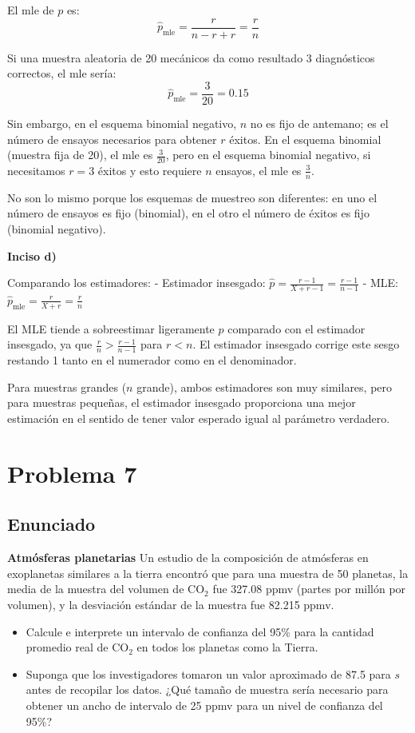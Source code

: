 \documentclass[12pt]{article}
\begin{document}
El mle de $p$ es:
$$\hat{p}_{\text{mle}} = \frac{r}{n-r+r} = \frac{r}{n}$$

Si una muestra aleatoria de 20 mecánicos da como resultado 3 diagnósticos correctos, el mle sería:
$$\hat{p}_{\text{mle}} = \frac{3}{20} = 0.15$$

Sin embargo, en el esquema binomial negativo, $n$ no es fijo de antemano; es el número de ensayos necesarios para obtener $r$ éxitos. En el esquema binomial (muestra fija de 20), el mle es $\frac{3}{20}$, pero en el esquema binomial negativo, si necesitamos $r=3$ éxitos y esto requiere $n$ ensayos, el mle es $\frac{3}{n}$.

No son lo mismo porque los esquemas de muestreo son diferentes: en uno el número de ensayos es fijo (binomial), en el otro el número de éxitos es fijo (binomial negativo).

\textbf{Inciso d)}

Comparando los estimadores:
- Estimador insesgado: $\hat{p} = \frac{r-1}{X+r-1} = \frac{r-1}{n-1}$
- MLE: $\hat{p}_{\text{mle}} = \frac{r}{X+r} = \frac{r}{n}$

El MLE tiende a sobreestimar ligeramente $p$ comparado con el estimador insesgado, ya que $\frac{r}{n} > \frac{r-1}{n-1}$ para $r < n$. El estimador insesgado corrige este sesgo restando 1 tanto en el numerador como en el denominador.

Para muestras grandes ($n$ grande), ambos estimadores son muy similares, pero para muestras pequeñas, el estimador insesgado proporciona una mejor estimación en el sentido de tener valor esperado igual al parámetro verdadero.

\section{Problema 7}

\subsection{Enunciado}
\textbf{Atmósferas planetarias} Un estudio de la composición de atmósferas en exoplanetas similares a la tierra encontró que para una muestra de 50 planetas, la media de la muestra del volumen de CO$_2$ fue 327.08 ppmv (partes por millón por volumen), y la desviación estándar de la muestra fue 82.215 ppmv.

\begin{itemize}
    \item[a)] Calcule e interprete un intervalo de confianza del 95\% para la cantidad promedio real de CO$_2$ en todos los planetas como la Tierra.
    \item[b)] Suponga que los investigadores tomaron un valor aproximado de 87.5 para $s$ antes de recopilar los datos. ¿Qué tamaño de muestra sería necesario para obtener un ancho de intervalo de 25 ppmv para un nivel de confianza del 95\%?
\end{itemize}
\end{document}
